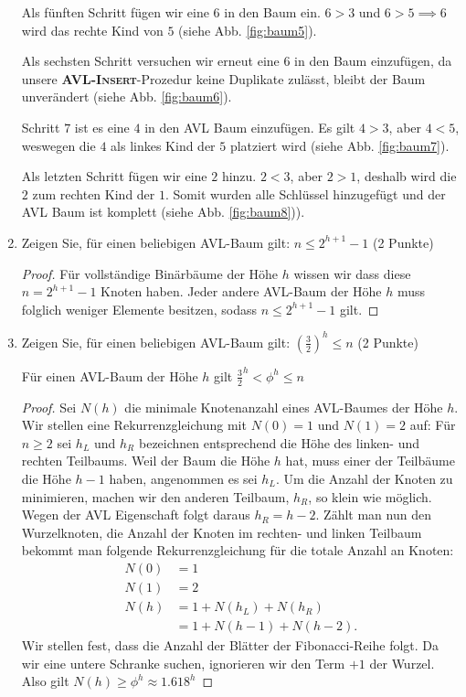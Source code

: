 \documentclass[ngerman,landscape,twocolumn]{adtexsheet}
\begin{document}
\begin{question}
\begin{enumerate}
        Als fünften Schritt fügen wir eine $6$ in den Baum ein. $6>3$ und $6>5 \implies 6$ wird das rechte Kind von $5$ (siehe Abb. \ref{fig:baum5}).
        
        Als sechsten Schritt versuchen wir erneut eine $6$ in den Baum einzufügen, da unsere \textbf{\textsc{AVL-Insert}}-Prozedur keine Duplikate zulässt, bleibt der Baum unverändert (siehe Abb. \ref{fig:baum6}).
        
        Schritt $7$ ist es eine $4$ in den AVL Baum einzufügen. Es gilt $4>3$, aber $4<5$, weswegen die $4$ als linkes Kind der $5$ platziert wird (siehe Abb. \ref{fig:baum7}).
        
        Als letzten Schritt fügen wir eine $2$ hinzu. $2<3$, aber $2>1$, deshalb wird die $2$ zum rechten Kind der $1$. Somit wurden alle Schlüssel hinzugefügt und der AVL Baum ist komplett (siehe Abb. \ref{fig:baum8})). \hfill \qedsymbol

        \newpage
        \item  Zeigen Sie, für einen beliebigen AVL-Baum gilt: $n \leq 2^{h+1} - 1$ (2 Punkte)
        \begin{proof}
            Für vollständige Binärbäume der Höhe $h$ wissen wir dass diese $n = 2^{h+1} - 1$ Knoten haben. Jeder andere AVL-Baum der Höhe $h$ muss folglich weniger Elemente besitzen, sodass $n \leq 2^{h+1} - 1$ gilt.
        \end{proof}
        
        \item Zeigen Sie, für einen beliebigen AVL-Baum gilt: $(\frac{3}{2})^h \leq n$ (2 Punkte)
        \begin{behauptung}
            Für einen AVL-Baum der Höhe $h$ gilt $\frac{3}{2}^h < \phi^h \leq n$
        \end{behauptung}
        \begin{proof}
            Sei $N(h)$ die minimale Knotenanzahl eines AVL-Baumes der Höhe $h$. Wir stellen eine Rekurrenzgleichung mit $N(0) = 1$ und $N(1) = 2$ auf:
            Für $n\geq2$ sei $h_L$ und $h_R$ bezeichnen entsprechend die Höhe des linken- und rechten Teilbaums. Weil der Baum die Höhe $h$ hat, muss einer der Teilbäume die Höhe $h-1$ haben, angenommen es sei $h_L$.
            Um die Anzahl der Knoten zu minimieren, machen wir den anderen Teilbaum, $h_R$, so klein wie möglich. Wegen der AVL Eigenschaft folgt daraus $h_R = h-2$. Zählt man nun den Wurzelknoten, die Anzahl der Knoten im rechten- und linken Teilbaum bekommt man folgende Rekurrenzgleichung für die totale Anzahl an Knoten:
            \begin{align*}
                N(0) &= 1 \\
                N(1) &= 2 \\
                N(h) &= 1 + N(h_L) + N(h_R) \\
                &= 1 + N(h - 1) + N(h - 2).
            \end{align*}
            Wir stellen fest, dass die Anzahl der Blätter der Fibonacci-Reihe folgt. Da wir eine untere Schranke suchen, ignorieren wir den Term $+1$ der Wurzel.
            Also gilt $N(h) \geq \phi^h \approx 1.618^h$
            

\end{proof}
\end{enumerate}
\end{question}
\end{document}
